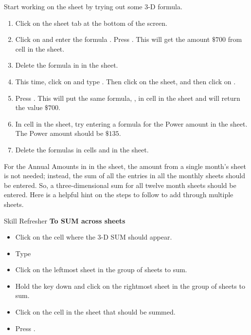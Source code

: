 Start working on the  sheet by trying out some 3-D formula.

\begin{enumerate}
	\item Click on the  sheet tab at the bottom of the screen.
	\item Click on  and enter the formula . Press . This will get the amount $ \$700 $ from cell  in the  sheet.
	\item Delete the formula in  in the  sheet.
	\item This time, click on  and type \fmtTyping{=}. Then click on the  sheet, and then click on .
	\item Press . This will put the same formula, , in cell  in the  sheet and will return the value $ \$700 $.
	\item In cell  in the  sheet, try entering a formula for the Power amount in the  sheet. The Power amount should be $ \$135 $.
	\item Delete the formulas in cells  and  in the  sheet.
\end{enumerate}

For the Annual Amounts in  in the  sheet, the amount from a single month's sheet is not needed; instead, the sum of all the entries in all the monthly sheets should be entered. So, a three-dimensional sum for all twelve month sheets should be entered. Here is a helpful hint on the steps to follow to add through multiple sheets.

\begin{center}
	\begin{sklbox}{Skill Refresher}
		\textbf{To SUM across sheets}
		\\
		\begin{itemize}
			\setlength{\itemsep}{0pt}
			\setlength{\parskip}{0pt}
			\setlength{\parsep}{0pt}
			
			\item Click on the cell where the 3-D SUM should appear.
			\item Type 
			\item Click on the leftmost sheet in the group of sheets to sum.
			\item Hold the  key down and click on the rightmost sheet in the group of sheets to sum.
			\item Click on the cell in the sheet that should be summed.
			\item Press .
			
		\end{itemize}
	\end{sklbox}
\end{center}

